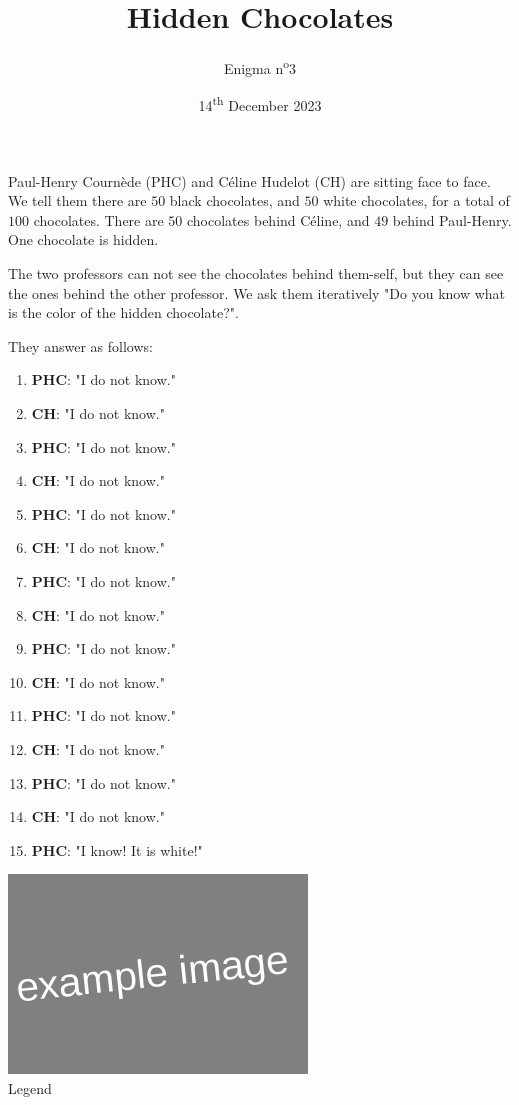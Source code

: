 \documentclass[a4paper, top=10mm]{article}
\title{\textbf{\huge{Hidden Chocolates}}}
\author{Enigma n\textsuperscript{o}3}
\date{14\textsuperscript{th} December 2023}
\begin{document}
	\maketitle
	
	Paul-Henry Cournède (PHC) and Céline Hudelot (CH) are sitting face to face.
	We tell them there are $50$ black chocolates, and $50$ white chocolates, for a total of $100$ chocolates.
	There are $50$ chocolates behind Céline, and $49$ behind Paul-Henry.
	One chocolate is hidden.
	
	The two professors can not see the chocolates behind them-self, but they can see the ones behind the other professor.
	We ask them iteratively "Do you know what is the color of the hidden chocolate?".
	
	They answer as follows:
	
	\begin{enumerate}
		\item \textbf{PHC}: "I do not know."
		\item \textbf{CH}: "I do not know."
		\item \textbf{PHC}: "I do not know."
		\item \textbf{CH}: "I do not know."
		\item \textbf{PHC}: "I do not know."
		\item \textbf{CH}: "I do not know."
		\item \textbf{PHC}: "I do not know."
		\item \textbf{CH}: "I do not know."
		\item \textbf{PHC}: "I do not know."
		\item \textbf{CH}: "I do not know."
		\item \textbf{PHC}: "I do not know."
		\item \textbf{CH}: "I do not know."
		\item \textbf{PHC}: "I do not know."
		\item \textbf{CH}: "I do not know."
		\item \textbf{PHC}: "I know! It is white!"
	\end{enumerate}
	
	\begin{center}
		\includegraphics[height=150pt]{00example.png}\\
		Legend
	\end{center}
	
\end{document}
